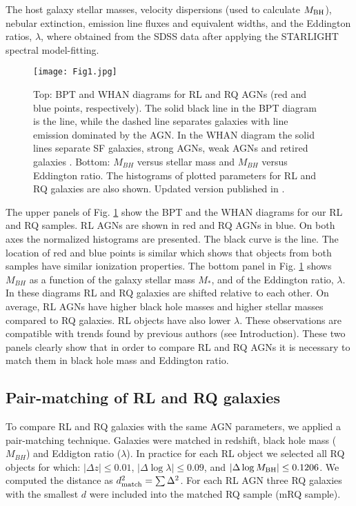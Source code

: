 \documentclass[utf8]{frontiersSCNS}
\newcommand{\MBH}{$M_{\rm BH}$}
\begin{document}
The host galaxy stellar masses, velocity dispersions (used to calculate \MBH),  nebular extinction,  emission line fluxes and equivalent widths, and the Eddington ratios, $\lambda$, where obtained from the SDSS data after applying the STARLIGHT \citep{CidFernandes.etal.2005a} spectral model-fitting.

\begin{figure}[h!]
\begin{center}
\texttt{[image: Fig1.jpg]}
\end{center}
\caption{Top: BPT and WHAN diagrams for RL and RQ AGNs (red and blue points, respectively). The solid black line in the BPT diagram is the \citet{Kewley.etal.2001a} line, while the dashed line separates galaxies with line emission dominated by the AGN. In the WHAN diagram the solid lines separate SF galaxies, strong AGNs, weak AGNs and retired galaxies \citep{CidFernandes.etal.2011a}. Bottom: $M_{BH}$ versus stellar mass and $M_{BH}$ versus Eddington ratio. The histograms of plotted parameters for RL and RQ galaxies are also shown. Updated version published in \citet{KozielWierzbowska.etal.2017a}. }\label{fig:1}
\end{figure}
 
The upper panels of Fig. \ref{fig:1} show the BPT \citep{Baldwin.Phillips.Terlevich.1981a} and the WHAN \citep{CidFernandes.etal.2011a} diagrams for our RL and RQ samples. RL AGNs are shown in red and RQ AGNs in blue. On both axes the normalized histograms are presented. The black curve is the \citet{Kewley.etal.2001a} line. The location of red and blue points is similar which shows that objects from both samples have similar ionization properties. 
The bottom panel in Fig. \ref{fig:1} shows $M_{BH}$ as a function of the galaxy stellar mass $M_{*}$, and of the Eddington ratio, $\lambda$. In these diagrams RL and RQ galaxies are shifted relative to each other. On average, RL AGNs have higher black hole masses and higher stellar masses compared to RQ galaxies. RL objects have also lower $\lambda$. These observations are compatible with trends found by previous authors (see Introduction). These two panels clearly show that in order to compare RL and RQ AGNs it is necessary to match them in black hole mass and Eddington ratio. 

\subsection{Pair-matching of RL and RQ galaxies}

To compare RL and RQ galaxies with the same AGN parameters, we applied a pair-matching technique. Galaxies were matched in redshift, black hole mass ($M_{BH}$) and Eddigton ratio ($\lambda$). 
In practice for each RL object we selected all RQ objects for which: $|\Delta z| \le 0.01$, $|\Delta \log \lambda| \le 0.09$, and $|\Delta \log M_{\rm BH}| \le 0.1206$. We computed the distance as $d^2_{\rm match} = \sum \Delta^2$. For each RL AGN three RQ galaxies with the smallest $d$ were included into the matched RQ sample (mRQ sample). 
\end{document}
